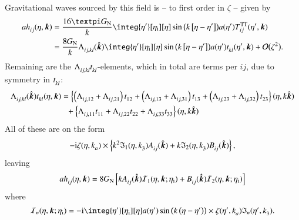 \begin{draft}
    Gravitational waves sourced by this field is -- to first order in $\zeta$ -- given by
    \begin{equation}
    \begin{split}
        a\tensor{h}{_{ij}}(\eta, \vec{k}) &= \frac{16\ppi G\ped{N}}{k} \integ{\eta'}[\eta\ped{i}][\eta] \sin{\pclosed{k\bclosed{\eta-\eta'}}} a(\eta')  \tensor*{T}{^{\mathrm{TT}}_{ij}}(\eta', \vec{k}) \\
        &= \frac{8 G\ped{N}}{k} \tensor{\Lambda}{_{ij,kl}}(\hat{\vec{k}}) \integ{\eta'}[\eta\ped{i}][\eta] \sin{\pclosed{k\bclosed{\eta-\eta'}}} a(\eta') t\lo{kl}(\eta', \vec{k}) + \BigO{\zeta^2}.
    \end{split}
    \end{equation}
    Remaining are the $\Lambda\lo{ij,kl}t\lo{kl}$-elements, which in total are  terms per $ij$, due to symmetry in $t\lo{kl}$: %
    \begin{equation}
    \begin{split}
        \Lambda\lo{ij,kl} (\hat{\vec{k}}) t\lo{kl} (\eta,\vec{k}) &= \cclosed{%
        \pclosed{%
            \Lambda\lo{ij,12} + \Lambda\lo{ij,21} } t\lo{12} %
        + \pclosed{%
            \Lambda\lo{ij,13} + \Lambda\lo{ij,31} } t\lo{13}  %
        + \pclosed{%
                \Lambda\lo{ij,23} + \Lambda\lo{ij,32} } t\lo{23} }(\eta, k\hat{\vec{k}}) \\
            &\phantom{=}+ \cclosed{
                \Lambda\lo{ij,11} t\lo{11} + \Lambda\lo{ij,22} t\lo{22} + \Lambda\lo{ij,33} t\lo{33}
            }(\eta, k\hat{\vec{k}})
    \end{split}
    \end{equation}
    All of these are on the form
    \begin{equation}
        -\im \zeta(\eta, k\lo{a}) \times \cclosed{k^2 \mathfrak{I}_1(\eta, k\lo{3}) A\lo{ij}(\hat{\vec{k}}) + k \mathfrak{I}_2(\eta, k\lo{3}) B\lo{ij}(\hat{\vec{k}})},
    \end{equation}
    leaving
    \begin{equation}
        ah\lo{ij} (\eta, \vec{k}) = 8G\ped{N} \bclosed{k A\lo{ij}(\hat{\vec{k}}) \mathcal{I}_1(\eta, \vec{k}; \eta\ped{i}) + B\lo{ij}(\hat{\vec{k}}) \mathcal{I}_2(\eta, \vec{k}; \eta\ped{i}) }
    \end{equation}
    where
    \begin{equation}
        \mathcal{I}_n(\eta, \vec{k}; \eta\ped{i}) = -\im \integ{\eta'}[\eta\ped{i}][\eta] a(\eta')  \sin{\pclosed{k\pclosed{\eta-\eta'}}} \times \zeta(\eta', k\lo{a}) \mathfrak{I}_n(\eta', k\lo{3}).

\end{equation}
\end{draft}
